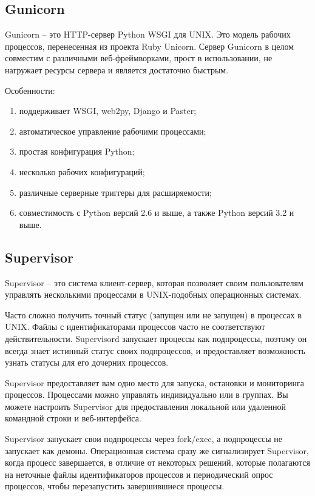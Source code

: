 \subsection{Gunicorn}
\label{sec:development:gunicorn}

Gunicorn -- это HTTP-сервер Python WSGI для UNIX. Это модель рабочих процессов, перенесенная из проекта Ruby Unicorn. Сервер Gunicorn в целом совместим с различными веб-фреймворками, прост в использовании, не нагружает ресурсы сервера и является достаточно быстрым.

Особенности:
\begin{enumerate}
  \item поддерживает WSGI, web2py, Django и Paster;
  \item автоматическое управление рабочими процессами;
  \item простая конфигурация Python;
  \item несколько рабочих конфигураций;
  \item различные серверные триггеры для расширяемости;
  \item совместимость с Python версий 2.6 и выше, а также Python версий 3.2 и выше.
\end{enumerate}

\subsection{Supervisor}
\label{sec:development:supervisor}

Supervisor -- это система клиент-сервер, которая позволяет своим пользователям управлять несколькими процессами в UNIX-подобных операционных системах.

Часто сложно получить точный статус (запущен или не запущен) в процессах в UNIX. Файлы с идентификаторами процессов часто не соответствуют действительности. Supervisord запускает процессы как подпроцессы, поэтому он всегда знает истинный статус своих подпроцессов, и предоставляет возможность узнать статусы для его дочерних процессов.

Supervisor предоставляет вам одно место для запуска, остановки и мониторинга процессов. Процессами можно управлять индивидуально или в \linebreak группах. Вы можете настроить Supervisor для предоставления локальной или удаленной командной строки и веб-интерфейса.

Supervisor запускает свои подпроцессы через fork/exec, а подпроцессы не запускает как демоны. Операционная система сразу же сигнализирует Supervisor, когда процесс завершается, в отличие от некоторых решений, которые полагаются на неточные файлы идентификаторов процессов и периодический опрос процессов, чтобы перезапустить завершившиеся процессы.

